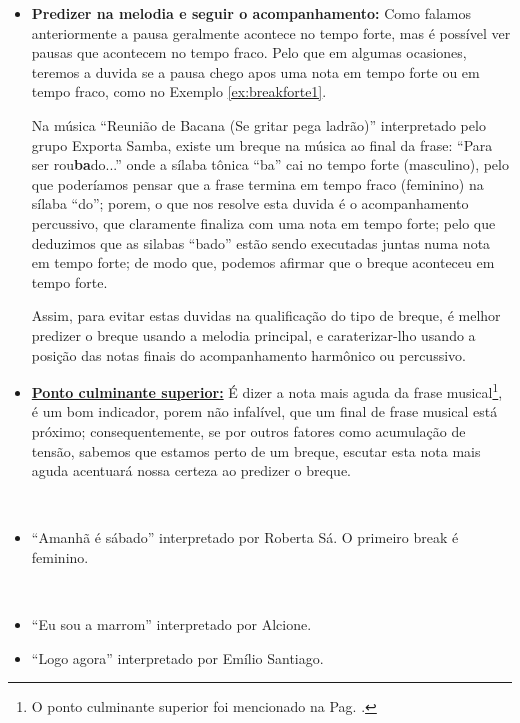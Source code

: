 \begin{itemize}
\item \textbf{Predizer na melodia e seguir o acompanhamento:}
Como falamos anteriormente a pausa geralmente acontece no tempo forte,
mas é possível ver pausas que acontecem no tempo fraco. 
Pelo que em algumas ocasiones, 
teremos a duvida se a pausa chego apos uma nota em tempo forte ou em tempo fraco,
como no Exemplo \ref{ex:breakforte1}.
\begin{example}
\label{ex:breakforte1}
Na música ``Reunião de Bacana (Se gritar pega ladrão)'' interpretado pelo grupo Exporta Samba,
existe um breque na música ao final da frase: ``Para ser rou\textbf{ba}do...''
onde a sílaba tônica ``ba'' cai no tempo forte (masculino), 
pelo que poderíamos pensar que a frase termina em tempo fraco (feminino) na sílaba ``do'';
porem, o que nos resolve esta duvida é o acompanhamento percussivo, 
que claramente finaliza com uma nota em tempo forte;
pelo que deduzimos que as silabas ``bado'' estão sendo executadas juntas numa nota em tempo forte;
de modo que, podemos afirmar que o breque aconteceu em tempo forte.
\end{example}
Assim, para evitar estas duvidas na qualificação do tipo de breque,
é melhor predizer o breque usando a melodia principal,
e caraterizar-lho usando a posição das notas finais do acompanhamento harmônico ou percussivo.
\item \hyperref[ref:PontoCulminanteSuperior]{\textbf{Ponto culminante superior:}} 
É dizer a nota mais aguda da frase musical\footnote{O 
ponto culminante superior foi mencionado na Pag. \pageref{ref:PontoCulminanteSuperior}.}, 
é um bom indicador, porem não infalível, que um final de frase musical está próximo; 
consequentemente, se por outros fatores como acumulação de tensão,
sabemos que estamos perto de um breque, escutar esta nota mais aguda acentuará nossa certeza ao predizer o breque.


\end{itemize}



\begin{example}~
\label{ex:breakfeminino}
\begin{itemize}
\item ``Amanhã é sábado'' interpretado por Roberta Sá. 
O primeiro break é feminino.
\end{itemize}
\end{example}

\begin{example}~
\label{ex:breaksincopados}
\begin{itemize}
\item ``Eu sou a marrom'' interpretado por Alcione.
\item ``Logo agora'' interpretado por Emílio Santiago.
\end{itemize}
\end{example}

